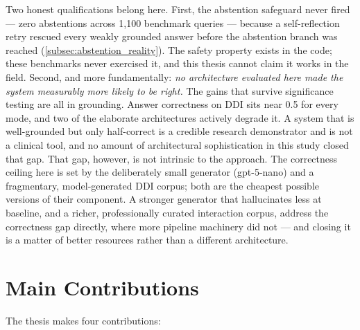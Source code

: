 Two honest qualifications belong here.
First, the abstention safeguard never fired --- zero abstentions across 1{,}100
benchmark queries --- because a self-reflection retry rescued every weakly
grounded answer before the abstention branch was reached
(\cref{subsec:abstention_reality}).
The safety property exists in the code; these benchmarks never exercised it, and
this thesis cannot claim it works in the field.
Second, and more fundamentally: \emph{no architecture evaluated here made the
system measurably more likely to be right.}
The gains that survive significance testing are all in grounding.
Answer correctness on DDI sits near 0.5 for every mode, and two of the elaborate
architectures actively degrade it.
A system that is well-grounded but only half-correct is a credible research
demonstrator and is not a clinical tool, and no amount of architectural
sophistication in this study closed that gap.
That gap, however, is not intrinsic to the approach.
The correctness ceiling here is set by the deliberately small generator
(gpt-5-nano) and a fragmentary, model-generated DDI corpus; both are the cheapest
possible versions of their component.
A stronger generator that hallucinates less at baseline, and a richer,
professionally curated interaction corpus, address the correctness gap directly,
where more pipeline machinery did not --- and closing it is a matter of better
resources rather than a different architecture.

\section{Main Contributions}
\label{sec:contributions_summary}

The thesis makes four contributions:

